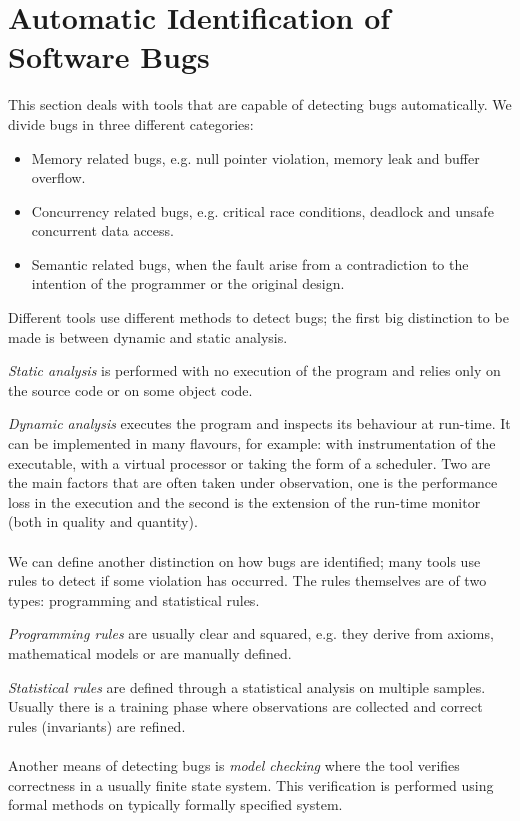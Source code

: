 
\section{Automatic Identification of Software Bugs}
This section deals with tools that are capable of detecting bugs automatically. We divide bugs in three different categories:
\begin{itemize}
    \item Memory related bugs, e.g. null pointer violation, memory leak and buffer overflow.
    \item Concurrency related bugs, e.g. critical race conditions, deadlock and unsafe concurrent data access.
    \item Semantic related bugs, when the fault arise from a contradiction to the intention of the programmer or the original design.
\end{itemize}
Different tools use different methods to detect bugs; the first big distinction to be made is between dynamic and static analysis.

\emph{Static analysis} is performed with no execution of the program and relies only on the source code or on some object code. 

\emph{Dynamic analysis} executes the program and inspects its behaviour at run-time. It can be implemented in many flavours, for example: with instrumentation of the executable, with a virtual processor or taking the form of a scheduler. Two are the main factors that are often taken under observation, one is the performance loss in the execution and the second is the extension of the run-time monitor (both in quality and quantity).
\\
\\
We can define another distinction on how bugs are identified; many tools use rules to detect if some violation has occurred. The rules themselves are of two types: programming and statistical rules.

\emph{Programming rules} are usually clear and squared, e.g. they derive from axioms, mathematical models or are manually defined.

\emph{Statistical rules} are defined through a statistical analysis on multiple samples. Usually there is a training phase where observations are collected and correct rules (invariants) are refined.
\\
\\
Another means of detecting bugs is \emph{model checking} where the tool verifies correctness in a usually finite state system. This verification is performed using formal methods on typically formally specified system. 

